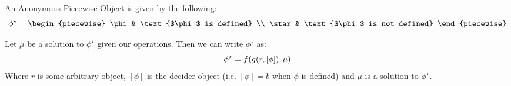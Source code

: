 \begin{theorem}
    An Anonymous Piecewise Object is given by the following:
    $$
        \phi^\star = \begin{piecewise}
            \phi & \text{$\phi$ is defined} \\
            \star & \text{$\phi$ is not defined}
        \end{piecewise}
    $$

    Let $\mu$ be a solution to $\phi^\star$ given our operations. Then we can write $\phi^\star$ as:
    $$
        \phi^\star = f\paren*{g\paren*{r,[\phi]},\mu}
    $$
    Where $r$ is some arbitrary object, $[\phi]$ is the decider object (i.e. $[\phi]=b$ when $\phi$ is defined) and $\mu$ is a solution to $\phi^\star$.
\end{theorem}


\newpage